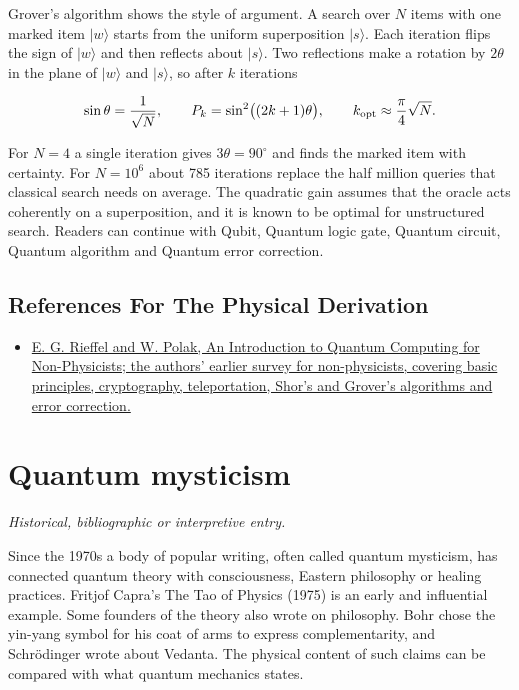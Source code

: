 \documentclass[11pt,oneside]{book}
\newenvironment{centeredalign}{\[\begin{gathered}[c]}{\end{gathered}\]}
\newcommand{\ket}[1]{\lvert #1\rangle}
\begin{document}
Grover's algorithm shows the style of argument. A search over \(N\) items with one marked item \(\ket{w}\) starts from the uniform superposition \(\ket{s}\). Each iteration flips the sign of \(\ket{w}\) and then reflects about \(\ket{s}\). Two reflections make a rotation by \(2\theta\) in the plane of \(\ket{w}\) and \(\ket{s}\), so after \(k\) iterations

\begin{centeredalign}
\sin\theta=\frac{1}{\sqrt N},\qquad P_k=\sin^2\bigl((2k+1)\theta\bigr),\qquad
k_{\rm opt}\approx\frac{\pi}{4}\sqrt N .
\end{centeredalign}

For \(N=4\) a single iteration gives \(3\theta=90^\circ\) and finds the marked item with certainty. For \(N=10^6\) about 785 iterations replace the half million queries that classical search needs on average. The quadratic gain assumes that the oracle acts coherently on a superposition, and it is known to be optimal for unstructured search. Readers can continue with Qubit, Quantum logic gate, Quantum circuit, Quantum algorithm and Quantum error correction.

\subsection*{References For The Physical Derivation}
\begin{itemize}
\item \href{https://arxiv.org/abs/quant-ph/9809016}{E. G. Rieffel and W. Polak, An Introduction to Quantum Computing for Non-Physicists; the authors' earlier survey for non-physicists, covering basic principles, cryptography, teleportation, Shor's and Grover's algorithms and error correction.}
\end{itemize}





\clearpage

\section{Quantum mysticism}

\label{topic:quantum-mysticism}

\par\smallskip\noindent\textit{Historical, bibliographic or interpretive entry.}

Since the 1970s a body of popular writing, often called quantum mysticism, has connected quantum theory with consciousness, Eastern philosophy or healing practices. Fritjof Capra's The Tao of Physics (1975) is an early and influential example. Some founders of the theory also wrote on philosophy. Bohr chose the yin-yang symbol for his coat of arms to express complementarity, and Schrödinger wrote about Vedanta. The physical content of such claims can be compared with what quantum mechanics states.
\end{document}
